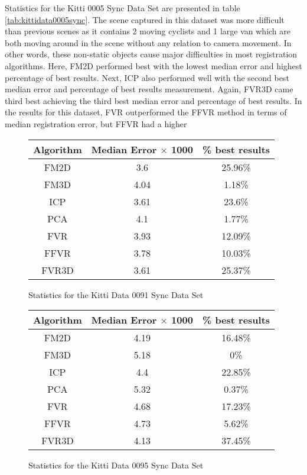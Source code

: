 Statistics for the Kitti 0005 Sync Data Set are presented in table \ref{tab:kittidata0005sync}. The scene captured in this dataset was more difficult than previous scenes as it contains 2 moving cyclists and 1 large van which are both moving around in the scene without any relation to camera movement. In other words, these non-static objects cause major difficulties in most registration algorithms. Here, FM2D performed best with the lowest median error and highest percentage of best results. Next, ICP also performed well with the second best median error and percentage of best results measurement. Again, FVR3D came third best achieving the third best median error and percentage of best results. In the results for this dataset, FVR outperformed the FFVR method in terms of median registration error, but FFVR had a higher 


\begin{figure}
\centering
\begin{tabular}{ccc}
\hline
\textbf{Algorithm} & \textbf{Median Error $\times$ 1000} & \textbf{\% best results}\\ \hline
FM2D	& 3.6 & 25.96\%\\
FM3D	& 4.04 & 1.18\%\\
ICP	& 3.61 & 23.6\%\\
PCA	& 4.1 & 1.77\%\\
FVR	& 3.93 & 12.09\%\\
FFVR	& 3.78 & 10.03\%\\
FVR3D	& 3.61 & 25.37\%\\
\end{tabular}
\caption{Statistics for the Kitti Data 0091 Sync Data Set}
\label{tab:kittidata0091sync}
\end{figure} 



\begin{figure}
\centering
\begin{tabular}{ccc}
\hline
\textbf{Algorithm} & \textbf{Median Error $\times$ 1000} & \textbf{\% best results}\\ \hline
FM2D	& 4.19 & 16.48\%\\
FM3D	& 5.18 & 0\%\\
ICP	& 4.4 & 22.85\%\\
PCA	& 5.32 & 0.37\%\\
FVR	& 4.68 & 17.23\%\\
FFVR	& 4.73 & 5.62\%\\
FVR3D	& 4.13 & 37.45\%\\
\end{tabular}
\caption{Statistics for the Kitti Data 0095 Sync Data Set}
\label{tab:kittidata0095sync}
\end{figure} 
